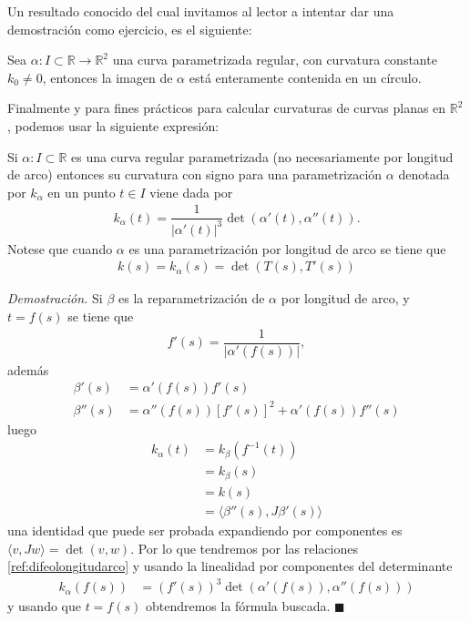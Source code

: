 \documentclass[oneside,11pt]{memoir}
\begin{document}
Un resultado conocido del cual invitamos al lector a intentar dar una demostración como ejercicio, es el siguiente:
\begin{proposition}
    Sea $\alpha:I\subset \mathbb{R}\to \mathbb{R}^2$ una curva parametrizada regular, con curvatura constante $k_0\neq 0$, entonces la imagen de $\alpha$ está enteramente contenida en un círculo.
\end{proposition}
Finalmente y para fines prácticos para calcular curvaturas de curvas planas en $\mathbb{R}^2$, podemos usar la siguiente expresión:
\begin{proposition}
Si $\alpha:I\subset \mathbb{R}$ es una curva regular parametrizada (no necesariamente por longitud de arco) entonces su curvatura con signo para una parametrización $\alpha$ denotada por $k_\alpha$ en un punto $t\in I$ viene dada por
\begin{align*}
    k_\alpha(t)=\dfrac{1}{|\alpha'(t)|^3}\det(\alpha'(t), \alpha''(t)).
\end{align*}   
Notese que cuando $\alpha$ es una parametrización por longitud de arco se tiene que
\begin{align*}
    k(s)=k_\alpha(s)=\det(T(s), T'(s))
\end{align*}
\end{proposition}
\textit{Demostración.} 
Si $\beta$ es la reparametrización de $\alpha$ por longitud de arco, y $t=f(s)$ se tiene que
\begin{align*}
    f'(s)=\dfrac{1}{|\alpha'(f(s))|},
\end{align*}
además
\begin{align}
    \beta'(s)&=\alpha'(f(s))f'(s)\nonumber\\
    \beta''(s)&=\alpha''(f(s))[f'(s)]^2+\alpha'(f(s))f''(s)\label{ref:difeolongitudarco}
\end{align}
luego
\begin{align*}
    k_\alpha(t)&=k_\beta(f^{-1}(t))\\
               &=k_\beta(s)\\
               &=k(s)\\
               &=\langle\beta''(s),J\beta'(s)\rangle
\end{align*}
una identidad que puede ser probada expandiendo por componentes es $\langle v,Jw\rangle=\det(v,w)$. Por lo que tendremos por las relaciones \ref{ref:difeolongitudarco} y usando la linealidad por componentes del determinante
\begin{align*}
    k_\alpha(f(s))&= \left( f'(s)\right)^3\det(\alpha'(f(s)), \alpha''(f(s)))
\end{align*}
y usando que $t=f(s)$ obtendremos la fórmula buscada. \hfill $\blacksquare$
\end{document}
